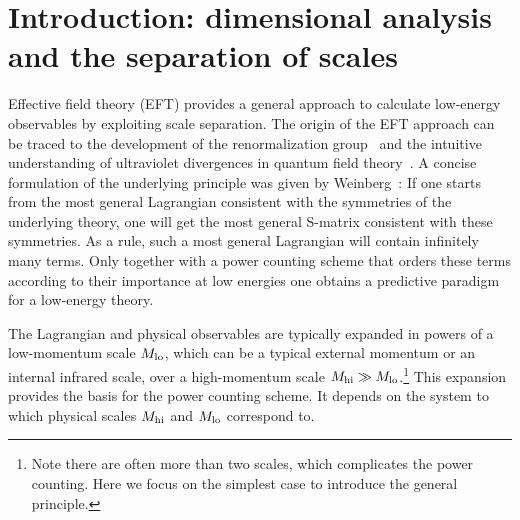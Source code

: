 \graphicspath{{Chapter4-figures/}}

\maketitle
{}



%
\section{Introduction: dimensional analysis and the separation of scales}
\label{sec:EFT-Intro}

Effective field theory (EFT) provides a general approach to calculate low-energy 
observables by exploiting scale separation.  The origin of the EFT approach can 
be traced to the development of the renormalization group~\cite{Wilson-83} and 
the intuitive understanding of ultraviolet divergences in quantum field 
theory~\cite{Lepage-89}.  A concise formulation of the underlying principle was 
given by Weinberg~\cite{Weinberg:1978kz}: If one 
starts from the most general Lagrangian consistent with the symmetries of the 
underlying theory, one will get the most general S-matrix consistent with these 
symmetries.  As a rule, such a most general Lagrangian will contain infinitely 
many terms.  Only together with a power counting scheme that orders these terms 
according to their importance at low energies one obtains a predictive paradigm 
for a low-energy theory.

The Lagrangian and physical observables are typically 
expanded in powers of a low-momentum scale $M_{\rm lo}$,
which can be a typical external momentum or an internal
infrared scale, over a high-momentum scale 
$M_{\rm hi}\gg M_{\rm lo}$.\footnote{Note there are often 
more than two scales, which complicates the power counting. Here we focus on
the simplest case to introduce the general principle.}
This expansion provides the basis for the power counting scheme.
It depends on the system to which physical scales 
$M_{\rm hi}$ and $M_{\rm lo}$ correspond to.  

